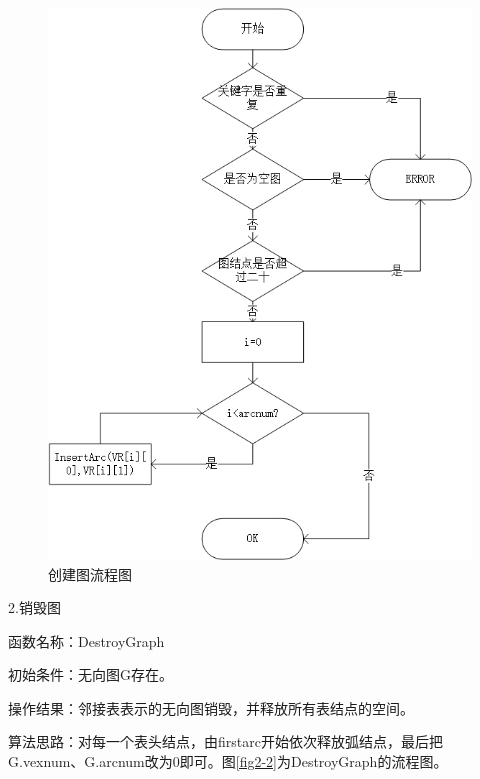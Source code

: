 \documentclass[supercite]{Experimental_Report}
\theoremstyle{definition}
\begin{document}
\begin{figure}[htb] %
	\begin{center}
		\includegraphics[scale=0.9]{./images/图/CreateGraph.jpg}
		\caption{创建图流程图}
		\label{fig2-1}
	\end{center}
\end{figure}

\newpage

2.销毁图

函数名称：DestroyGraph

初始条件：无向图G存在。

操作结果：邻接表表示的无向图销毁，并释放所有表结点的空间。

算法思路：对每一个表头结点，由firstarc开始依次释放弧结点，最后把G.vexnum、G.arcnum改为0即可。图\ref{fig2-2}为DestroyGraph的流程图。
\end{document}
